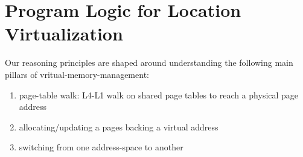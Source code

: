 \section{Program Logic for Location Virtualization}
\label{sec:logic}
\newcommand{\gammaPred}{\delta}

\newcommand{\sumwalkabs}[3]{
  \ownGhost\gammaPred{\authfrag{\singletonMap{#1}{(#2, #3)}}}
}
\newcommand{\ptableabswalk}[1]{\mathcal{A}\textsf{bsPTableWalk}(#1)}
\newcommand{\ptablestore}{\theta}
Our reasoning principles are shaped around understanding the following main pillars of vritual-memory-management:
\begin{enumerate}
\item page-table walk: L4-L1 walk on shared page tables to reach a physical page address
\item allocating/updating a pages backing a virtual address 
\item switching from one address-space to another 
\end{enumerate}
